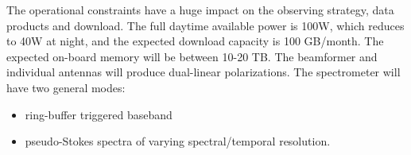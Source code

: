 The operational constraints have a huge impact on the observing strategy, data products and download.  The full daytime available power is 100W, which reduces to 40W at night, and the expected download capacity is 100 GB/month.  The expected on-board memory will be between 10-20 TB.  The beamformer and individual antennas will produce dual-linear polarizations.  The spectrometer will have two general modes:
\begin{itemize}[noitemsep]
    \item ring-buffer triggered baseband
    \item pseudo-Stokes spectra of varying spectral/temporal resolution.
\end{itemize}
